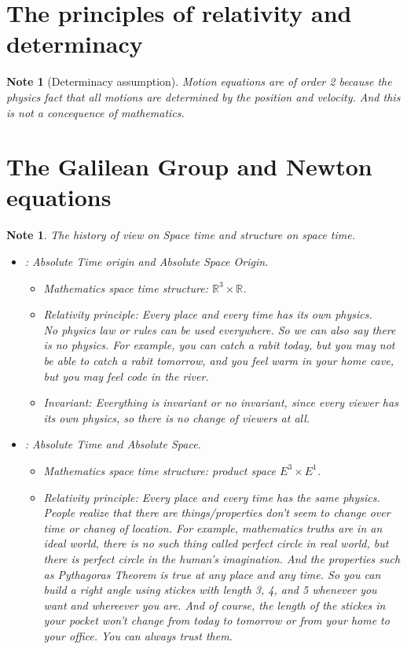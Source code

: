 \documentclass[pdf]{article}
\newtheorem{note}[theorem]{Note}
\begin{document}
\section{The principles of relativity and determinacy}

\begin{note}[Determinacy assumption]\label{determinacy}
Motion equations are of order 2 because the physics fact that all motions are determined by the position and velocity. And this is not a concequence of mathematics.
\end{note}
\section{The Galilean Group and Newton equations}
\begin{note}
The history of view on Space time and structure on space time.
\begin{itemize}
\item [Pre-Physics]: Absolute Time origin and Absolute Space Origin.
	\begin{itemize}
	\item Mathematics space time structure: $\mathbb{R}^3\times \mathbb{R}$.
	\item Relativity principle: Every place and every time has its own physics. \\
	No physics law or rules can be used everywhere. So we can also say there is no physics. For example, you can catch a rabit today, but you may not be able to catch a rabit tomorrow, and you feel warm in your home cave, but you may feel code in the river.
	\item Invariant: Everything is invariant or no invariant, since every viewer has its own physics, so there is no change of viewers at all.
	\end{itemize}
\item [Pre-Galileo]: Absolute Time and Absolute Space.
	\begin{itemize}
	\item Mathematics space time structure: product space $E^3\times E^1$.
	\item Relativity principle: Every place and every time has the same physics. \\
	People realize that there are things/properties don't seem to change over time or chaneg of location. For example, mathematics truths are in an ideal world, there is no such thing called perfect circle in real world, but there is perfect circle in the human's imagination. And the properties such as Pythagoras Theorem is true at any place and any time. So you can build a right angle using stickes with length 3, 4, and 5 whenever you want and whereever you are. And of course, the length of the stickes in your pocket won't change from today to tomorrow or from your home to your office. You can always trust them.

\end{itemize}
\end{itemize}
\end{note}
\end{document}
